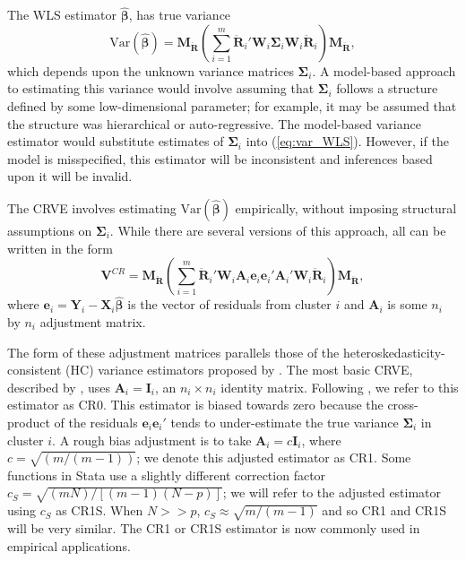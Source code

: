 \documentclass[12pt]{article}
\newcommand{\Var}{\text{Var}}
\newcommand{\bm}{\mathbf}
\newcommand{\bs}{\boldsymbol}
\begin{document}
The WLS estimator $\bs{\hat\beta}$, has true variance
\begin{equation}
\label{eq:var_WLS}
\Var\left(\bs{\hat\beta}\right) = \bm{M_{\ddot{R}}}\left(\sum_{i=1}^m \bm{\ddot{R}}_i' \bm{W}_i \bs\Sigma_i \bm{W}_i\bm{\ddot{R}}_i\right) \bm{M_{\ddot{R}}},
\end{equation}
which depends upon the unknown variance matrices $\bs\Sigma_i$. 
A model-based approach to estimating this variance would involve assuming that $\bm\Sigma_i$ follows a structure defined by some low-dimensional parameter; for example, it may be assumed that the structure was hierarchical or auto-regressive. 
The model-based variance estimator would substitute estimates of $\bs\Sigma_i$ into (\ref{eq:var_WLS}).
However, if the model is misspecified, this estimator will be inconsistent and inferences based upon it will be invalid.

The CRVE involves estimating $\Var\left(\bs{\hat\beta}\right)$ empirically, without imposing structural assumptions on $\bs\Sigma_i$. 
While there are several versions of this approach, all can be written in the form
\begin{equation}
\label{eq:V_small}
\bm{V}^{CR} = \bm{M_{\ddot{R}}}\left(\sum_{i=1}^m \bm{\ddot{R}}_i'\bm{W}_i \bm{A}_i \bm{e}_i \bm{e}_i' \bm{A}_i' \bm{W}_i \bm{\ddot{R}}_i\right) \bm{M_{\ddot{R}}},
\end{equation}
where $\bm{e}_i = \bm{Y}_i - \bm{X}_i \bs{\hat\beta}$ is the vector of residuals from cluster $i$ and $\bm{A}_i$ is some $n_i$ by $n_i$ adjustment matrix. 

The form of these adjustment matrices parallels those of the heteroskedasticity-consistent (HC) variance estimators proposed by \citet*{MacKinnon1985some}. 
The most basic CRVE, described by \citet{Liang1986longitudinal}, uses $\bm{A}_i = \bm{I}_i$, an $n_i \times n_i$ identity matrix. 
Following \citet{Cameron2015practitioners}, we refer to this estimator as CR0. 
This estimator is biased towards zero because the cross-product of the residuals $\bm{e}_i \bm{e}_i'$ tends to under-estimate the true variance $\bs\Sigma_i$ in cluster $i$.
A rough bias adjustment is to take $\bm{A}_i = c\bm{I}_i$, where $c = \sqrt{(m/(m-1))}$; we denote this adjusted estimator as CR1. Some functions in Stata use a slightly different correction factor $c_S = \sqrt{(m N)/[(m - 1)(N - p)]}$; we will refer to the adjusted estimator using $c_S$ as CR1S. When $N >> p$, $c_S \approx \sqrt{m/(m-1)}$ and so CR1 and CR1S will be very similar.
The CR1 or CR1S estimator is now commonly used in empirical applications.
\end{document}

